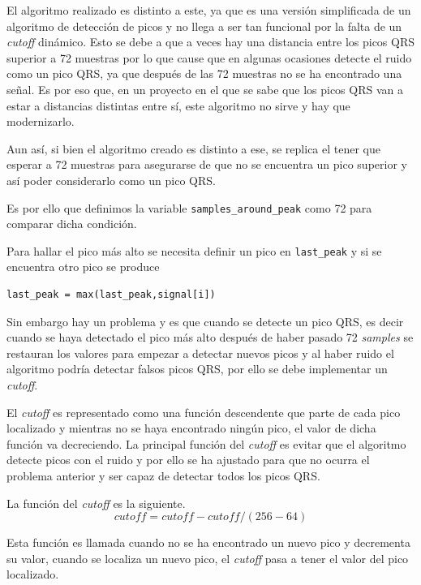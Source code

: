 El algoritmo realizado es distinto a este, ya que es una versión simplificada de un algoritmo de detección de picos y no llega a ser tan 
funcional por la falta de un \textit{cutoff} dinámico. Esto se debe a que a veces hay una distancia entre los picos QRS superior a 72 muestras 
por lo que cause que en algunas ocasiones detecte el ruido como un pico QRS, ya que después de las 72 muestras no se ha encontrado una señal.
Es por eso que, en un proyecto en el que se sabe que los picos QRS van a estar a distancias distintas entre sí, este algoritmo no sirve y 
hay que modernizarlo.

Aun así, si bien el algoritmo creado es distinto a ese, se replica el tener que esperar a 72 muestras
para asegurarse de que no se encuentra un pico superior y así poder considerarlo como un pico QRS.

Es por ello que definimos la variable \lstinline|samples_around_peak| como 72 para comparar dicha condición.

Para hallar el pico más alto se necesita definir un pico en \lstinline{last_peak} y si se encuentra otro pico se produce

\lstset{language=python, breaklines=true, basicstyle=\footnotesize}
\begin{lstlisting}[frame=single]
last_peak = max(last_peak,signal[i])
\end{lstlisting}

Sin embargo hay un problema y es que cuando se detecte un pico QRS, es decir cuando se haya detectado el pico 
más alto después de haber pasado 72 \textit{samples} se restauran los valores para empezar a detectar nuevos picos y al
haber ruido el algoritmo podría detectar falsos picos QRS, por ello se debe implementar un \textit{cutoff}.

El \textit{cutoff} es representado como una función descendente que parte de cada pico localizado y mientras no se haya
encontrado ningún pico, el valor de dicha función va decreciendo. La principal función del \textit{cutoff} es evitar que
el algoritmo detecte picos con el ruido y por ello se ha ajustado para que no ocurra el problema anterior y ser capaz de detectar todos los picos QRS.\@

La función del \textit{cutoff} es la siguiente.
    \[cutoff = cutoff - cutoff/(256 - 64)\]


Esta función es llamada cuando no se ha encontrado un nuevo pico y decrementa su valor, cuando se localiza un
nuevo pico, el \textit{cutoff} pasa a tener el valor del pico localizado.


